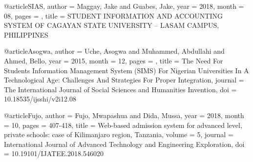 @article{SIAS,
    author = {Maggay, Jake and Guabes, Jake},
    year = {2018},
    month = {08},
    pages = {},
    title = {STUDENT INFORMATION AND ACCOUNTING SYSTEM OF CAGAYAN STATE UNIVERSITY – LASAM CAMPUS, PHILIPPINES}
}

@article{Asogwa,
    author = {Uche, Asogwa and Muhammed, Abdullahi and Ahmed, Bello},
    year = {2015},
    month = {12},
    pages = {},
    title = {The Need For Students Information Management System (SIMS) For Nigerian Universities In A Technological Age: Challenges And Strategies For Proper Integration},
    journal = {The International Journal of Social Sciences and Humanities Invention},
    doi = {10.18535/ijsshi/v2i12.08}
}

@article{Fujo,
    author = {Fujo, Mwapashua and Dida, Mussa},
    year = {2018},
    month = {10},
    pages = {407-418},
    title = {Web-based admission system for advanced level, private schools: case of Kilimanjaro region, Tanzania},
    volume = {5},
    journal = {International Journal of Advanced Technology and Engineering Exploration},
    doi = {10.19101/IJATEE.2018.546020}
}



















